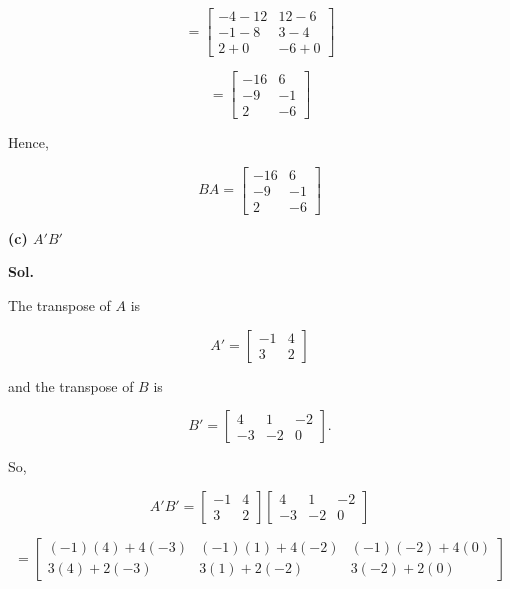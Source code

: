 \documentclass[12pt]{article}
\begin{document}
\[
=
\begin{bmatrix}
-4-12 & 12-6\\
-1-8 & 3-4\\
2+0 & -6+0
\end{bmatrix}
\]

\[
=
\begin{bmatrix}
-16 & 6\\
-9 & -1\\
2 & -6
\end{bmatrix}
\]

\noindent
Hence,

\[
\boxed{
BA=
\begin{bmatrix}
-16 & 6\\
-9 & -1\\
2 & -6
\end{bmatrix}
}
\]

\vspace{1cm}

\noindent
\textbf{(c) \(A'B'\)}

\vspace{0.5cm}

\noindent
\textbf{Sol.}

\vspace{0.3cm}

\noindent
The transpose of \(A\) is

\[
A'
=
\begin{bmatrix}
-1 & 4\\
3 & 2
\end{bmatrix}
\]

\noindent
and the transpose of \(B\) is

\[
B'
=
\begin{bmatrix}
4 & 1 & -2\\
-3 & -2 & 0
\end{bmatrix}.
\]

\vspace{0.5cm}

\noindent
So,

\vspace{0.5cm}

\[
A'B'
=
\begin{bmatrix}
-1 & 4\\
3 & 2
\end{bmatrix}
\begin{bmatrix}
4 & 1 & -2\\
-3 & -2 & 0
\end{bmatrix}
\]

\[
=
\begin{bmatrix}
(-1)(4)+4(-3) &
(-1)(1)+4(-2) &
(-1)(-2)+4(0)
\\
3(4)+2(-3) &
3(1)+2(-2) &
3(-2)+2(0)
\end{bmatrix}
\]
\end{document}
